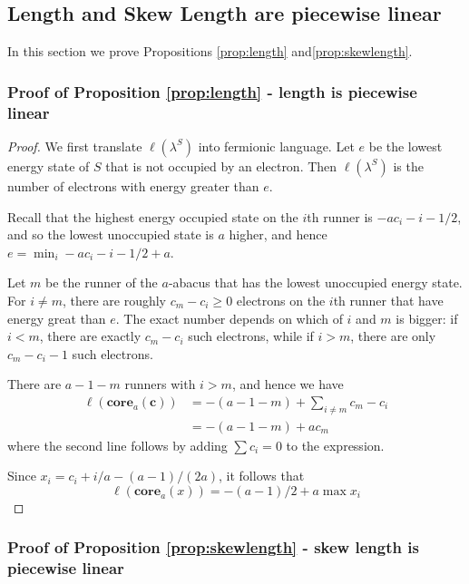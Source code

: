 \documentclass{amsart}[12pt]
\theoremstyle{definition}
\newcommand{\core}{\mathbf{core}}
\begin{document}
\subsection{Length and Skew Length are piecewise linear}
In this section we prove Propositions \ref{prop:length} and\ref{prop:skewlength}.

\subsubsection{Proof of Proposition \ref{prop:length} - length is piecewise linear} 


\begin{proof}
We first translate $\ell(\lambda^S)$ into fermionic language.
Let $e$ be the lowest energy state of $S$ that is not occupied by an electron.  Then $\ell(\lambda^S)$ is the number of electrons with energy greater than $e$.

Recall that the highest energy occupied state on the $i$th runner is $-ac_i-i-1/2$, and so the lowest unoccupied state is $a$ higher, and hence $e=\min_i -ac_i-i-1/2+a$.  

Let $m$ be the runner of the $a$-abacus that has the lowest unoccupied energy state.  For $i\neq m$, there are roughly $c_m-c_i\geq 0 $ electrons on the $i$th runner that have energy great than $e$.  The exact number depends  on which of $i$ and $m$ is bigger: if $i<m$, there are exactly $c_m-c_i$ such electrons, while if $i>m$, there are only $c_m-c_i-1$ such electrons. 

 There are $a-1-m$ runners with $i>m$, and hence we have
\begin{align*}
\ell(\core_a(\mathbf{c})) & =-(a-1-m)+\sum_{i\neq m} c_m-c_i \\
 &=-(a-1-m)+ac_m
 \end{align*}
 where the second line follows by adding $\sum c_i=0$ to the expression.

Since $x_i=c_i+i/a-(a-1)/(2a)$, it follows that
$$
\ell(\core_a(x))= -(a-1)/2+a\max x_i 
$$

\end{proof}





\subsubsection{Proof of Proposition \ref{prop:skewlength} - skew length is piecewise linear}
\end{document}
